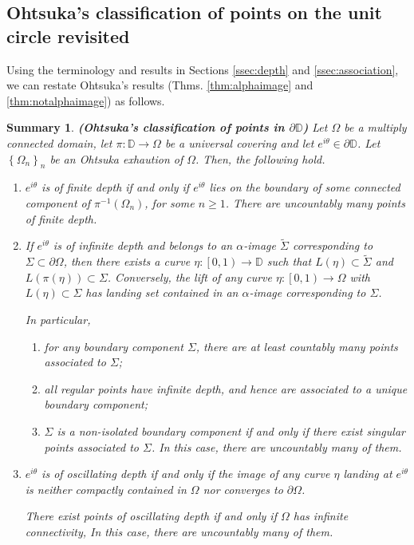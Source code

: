 \documentclass[11pt,a4paper,reqno]{amsart}
\theoremstyle{plain}
\newtheorem{summ}[thm]{Summary}
\theoremstyle{definition}
\theoremstyle{plain}
\renewcommand{\tilde}{\widetilde}
\begin{document}
\subsection{Ohtsuka's classification of points on the unit circle revisited}\label{ssec:Ohtsuka2}
Using the terminology and results in Sections \ref{ssec:depth} and \ref{ssec:association}, we can restate Ohtsuka's results (Thms. \ref{thm:alphaimage} and \ref{thm:notalphaimage}) as follows.
\begin{summ}{\bf (Ohtsuka's classification of points in $ \partial \mathbb{D} $) %
	} \label{thm-ohtsuka}
	Let $ \Omega $ be a multiply connected domain,  let $ \pi\colon\mathbb{D}\to\Omega $ be a universal covering and let $ e^{i\theta}\in\partial\mathbb{D} $. Let $ \left\lbrace \Omega_n\right\rbrace _n $ be an Ohtsuka exhaution of $ \Omega $. Then, the following hold.
	\begin{enumerate}[label={\em (\alph*)}]
	\item $ e^{i\theta} $ is of finite depth if and only if $ e^{i\theta}  $ lies on the boundary of some connected component of $ \pi^{-1}(\Omega_n) $, for some $ n\geq 1 $. There are uncountably many points of finite depth.
	\item If $ e^{i\theta} $ is of infinite depth and belongs to an $ \alpha $-image $ \tilde\Sigma $ corresponding to $ \Sigma \subset\partial \Omega $, then there exists a curve $ \eta\colon\left[ 0,1\right) \to \mathbb{D}$ such that $ L(\eta)\subset \tilde\Sigma $ and $ L(\pi(\eta))\subset \Sigma $. Conversely, the lift of any curve $ \eta\colon\left[ 0,1\right) \to \Omega$ with $ L(\eta)\subset \Sigma $ has landing set contained in an $ \alpha $-image  corresponding to $ \Sigma $.

	\noindent In particular,
	\begin{enumerate}[label={\em (\roman*)}]
		\item for any boundary component $ \Sigma $, there are at least countably many  points associated to $ \Sigma $;
		\item all regular points have infinite depth, and hence are associated to a unique boundary component;
		\item $ \Sigma $ is a non-isolated boundary component if and only if there exist singular points associated to $ \Sigma $. In this case, there are uncountably many of them.
	\end{enumerate}
		\item $ e^{i\theta} $ is of oscillating depth if and only if the image of any curve $ \eta $ landing at $ e^{i\theta} $ is neither compactly contained in $ \Omega $ nor converges to $\partial \Omega $. 
	
		\noindent There exist points of oscillating depth if and only if $ \Omega $ has infinite connectivity, In this case, there are uncountably many of them.
\end{enumerate}
\end{summ}
\end{document}

